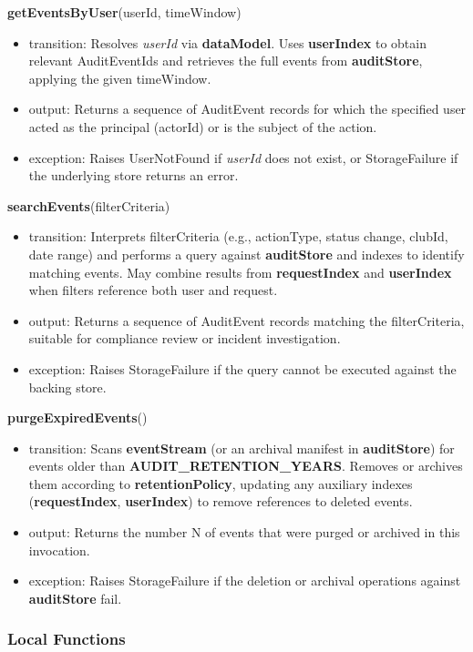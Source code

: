 \documentclass[12pt, titlepage]{article}
\begin{document}
\noindent\textbf{getEventsByUser}(userId, timeWindow)
\begin{itemize}
  \item transition: Resolves \textit{userId} via \textbf{dataModel}. Uses \textbf{userIndex} to obtain relevant AuditEventIds and retrieves the full events from \textbf{auditStore}, applying the given timeWindow.
  \item output: Returns a sequence of AuditEvent records for which the specified user acted as the principal (actorId) or is the subject of the action.
  \item exception: Raises UserNotFound if \textit{userId} does not exist, or StorageFailure if the underlying store returns an error.
\end{itemize}

\noindent\textbf{searchEvents}(filterCriteria)
\begin{itemize}
  \item transition: Interprets filterCriteria (e.g., actionType, status change, clubId, date range) and performs a query against \textbf{auditStore} and indexes to identify matching events. May combine results from \textbf{requestIndex} and \textbf{userIndex} when filters reference both user and request.
  \item output: Returns a sequence of AuditEvent records matching the filterCriteria, suitable for compliance review or incident investigation.
  \item exception: Raises StorageFailure if the query cannot be executed against the backing store.
\end{itemize}

\noindent\textbf{purgeExpiredEvents}()
\begin{itemize}
  \item transition: Scans \textbf{eventStream} (or an archival manifest in \textbf{auditStore}) for events older than \textbf{AUDIT\_RETENTION\_YEARS}. Removes or archives them according to \textbf{retentionPolicy}, updating any auxiliary indexes (\textbf{requestIndex}, \textbf{userIndex}) to remove references to deleted events.
  \item output: Returns the number N of events that were purged or archived in this invocation.
  \item exception: Raises StorageFailure if the deletion or archival operations against \textbf{auditStore} fail.
\end{itemize}

\subsubsection{Local Functions}
\end{document}
